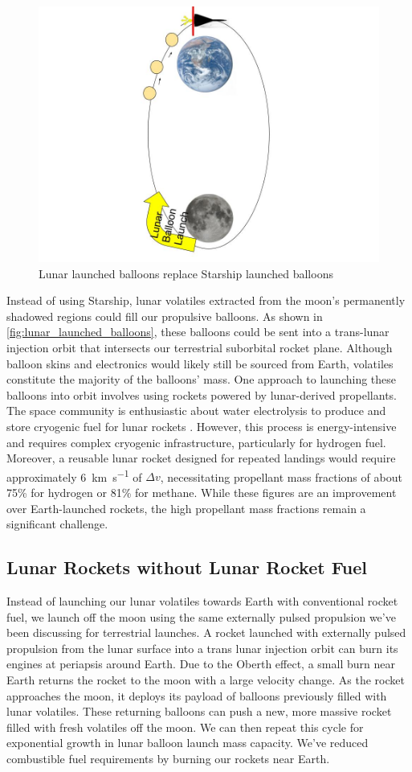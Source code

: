 \documentclass{article}
\begin{document}
{\begin{figure}[htbp]
    \centering
    \includegraphics[width=0.5\linewidth]{images/Water Drawing From Moon.jpg}
    \caption{Lunar launched balloons replace Starship launched balloons \cite{earth_image} \cite{moon_image}}
    \label{fig:lunar_launched_balloons}
\end{figure}
Instead of using Starship, lunar volatiles extracted from the moon's permanently shadowed regions could fill our propulsive balloons. As shown in \autoref{fig:lunar_launched_balloons}, these balloons could be sent into a trans-lunar injection orbit that intersects our terrestrial suborbital rocket plane. Although balloon skins and electronics would likely still be sourced from Earth, volatiles constitute the majority of the balloons' mass. One approach to launching these balloons into orbit involves using rockets powered by lunar-derived propellants. The space community is enthusiastic about water electrolysis to produce and store cryogenic fuel for lunar rockets \cite{nasa_water}. However, this process is energy-intensive and requires complex cryogenic infrastructure, particularly for hydrogen fuel. Moreover, a reusable lunar rocket designed for repeated landings would require approximately \SI{6}{\km\per\second} of $\Delta v$, necessitating propellant mass fractions of about 75\% for hydrogen or 81\% for methane. While these figures are an improvement over Earth-launched rockets, the high propellant mass fractions remain a significant challenge.   

\subsection{Lunar Rockets without Lunar Rocket Fuel} \label{sec:lunar_rockets_no_fuel}
Instead of launching our lunar volatiles towards Earth with conventional rocket fuel, we launch off the moon using the same externally pulsed propulsion we've been discussing for terrestrial launches.   A rocket launched with externally pulsed propulsion from the lunar surface into a trans lunar injection orbit can burn its engines at periapsis around Earth.  Due to the Oberth effect, a small burn near Earth returns the rocket to the moon with a large velocity change.  As the rocket approaches the moon, it deploys its payload of balloons previously filled with lunar volatiles.  These returning balloons can push a new, more massive rocket filled with fresh volatiles off the moon.   We can then repeat this  cycle for exponential growth in lunar balloon launch mass capacity.   We've reduced combustible fuel requirements by burning our rockets near Earth.


}
\end{document}
